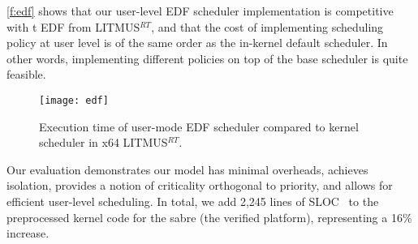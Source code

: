 \autoref{f:edf} shows that our user-level EDF scheduler implementation is
competitive with t EDF from LITMUS$^{RT}$, and
that the cost of implementing scheduling policy at user level is of
the same order as the in-kernel default scheduler. In other words,
implementing different policies on top of the base scheduler is quite feasible.

\begin{figure}[t]
    \centering
    \texttt{[image: edf]}
    \caption{Execution time of \selfour user-mode EDF scheduler compared to
             kernel scheduler in x64 LITMUS$^{RT}$.}
    \label{f:edf}
\end{figure}


Our evaluation demonstrates our model has minimal overheads, achieves isolation,  provides a notion
of criticality orthogonal to priority, and allows for efficient user-level scheduling.
In total, we add 2,245 lines of SLOC~\citep{Wheeler_01} to the preprocessed kernel code for the sabre
(the verified platform), representing a 16\% increase.

